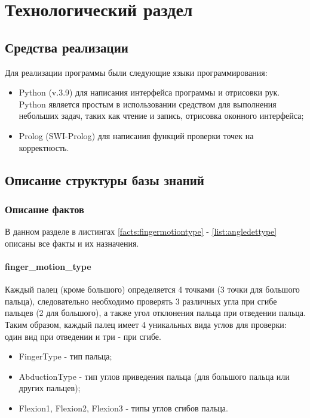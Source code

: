 \chapter{Технологический раздел}


\section{Средства реализации}
\hspace{0.6cm} Для реализации программы были следующие языки программирования:
\begin{itemize}
	\item Python (v.3.9\cite{web:python}) для написания интерфейса программы и отрисовки рук. Python является простым в использовании средством для выполнения небольших задач, таких как чтение и запись, отрисовка оконного интерфейса;
	\item Prolog (SWI-Prolog\cite{web:prolog}) для написания функций проверки точек на корректность.
\end{itemize}
 
\section{Описание структуры базы знаний}

\subsection{Описание фактов}
\hspace{0.6cm} В данном разделе в листингах \ref{facts:fingermotiontype} - \ref{list:angledettype} описаны все факты и их назначения.
\subsubsection{finger\_motion\_type}
\hspace{0.6cm} Каждый палец (кроме большого) определяется 4 точками (3 точки для большого пальца), следовательно необходимо проверять 3 различных угла при сгибе пальцев (2 для большого), а также угол отклонения пальца при отведении пальца. Таким образом, каждый палец имеет 4 уникальных вида углов для проверки: один вид при отведении и три - при сгибе. 

\begin{itemize}
	\item FingerType - тип пальца;
	\item AbductionType - тип углов приведения пальца (для большого пальца или других пальцев);
	\item Flexion1, Flexion2, Flexion3 - типы углов сгибов пальца.
\end{itemize}

